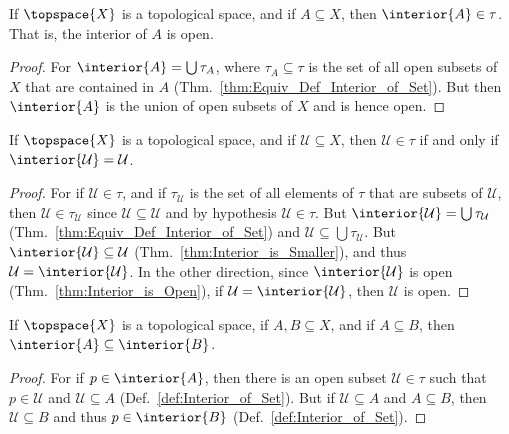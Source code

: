         \begin{theorem}
            \label{thm:Interior_is_Open}%
            If $\topspace{X}$ is a topological space, and if
            $A\subseteq{X}$, then $\interior{A}\in\tau$. That is, the
            interior of $A$ is open.
        \end{theorem}
        \begin{proof}
            For $\interior{A}=\bigcup\tau_{A}$, where
            $\tau_{A}\subseteq\tau$ is the set of all open subsets of $X$
            that are contained in $A$
            (Thm.~\ref{thm:Equiv_Def_Interior_of_Set}). But then
            $\interior{A}$ is the union of open subsets of $X$ and is hence
            open.
        \end{proof}
        \begin{theorem}
            \label{thm:Open_iff_Int_A_eq_A}%
            If $\topspace{X}$ is a topological space, and if
            $\mathcal{U}\subseteq{X}$, then $\mathcal{U}\in\tau$ if and only
            if $\interior{\mathcal{U}}=\mathcal{U}$.
        \end{theorem}
        \begin{proof}
            For if $\mathcal{U}\in\tau$, and if $\tau_{\mathcal{U}}$ is the
            set of all elements of $\tau$ that are subsets of $\mathcal{U}$,
            then $\mathcal{U}\in\tau_{\mathcal{U}}$ since
            $\mathcal{U}\subseteq\mathcal{U}$ and by hypothesis
            $\mathcal{U}\in\tau$. But
            $\interior{\mathcal{U}}=\bigcup\tau_{\mathcal{U}}$
            (Thm.~\ref{thm:Equiv_Def_Interior_of_Set}) and
            $\mathcal{U}\subseteq\bigcup\tau_{\mathcal{U}}$. But
            $\interior{\mathcal{U}}\subseteq\mathcal{U}$
            (Thm.~\ref{thm:Interior_is_Smaller}), and thus
            $\mathcal{U}=\interior{\mathcal{U}}$. In the other direction,
            since $\interior{\mathcal{U}}$ is open
            (Thm.~\ref{thm:Interior_is_Open}), if
            $\mathcal{U}=\interior{\mathcal{U}}$, then $\mathcal{U}$ is
            open.
        \end{proof}
        \begin{theorem}
            \label{thm:Interior_Preserves_Inclusion}%
            If $\topspace{X}$ is a topological space, if $A,B\subseteq{X}$,
            and if $A\subseteq{B}$, then
            $\interior{A}\subseteq\interior{B}$.
        \end{theorem}
        \begin{proof}
            For if $p\in\interior{A}$, then there is an open subset
            $\mathcal{U}\in\tau$ such that $p\in\mathcal{U}$ and
            $\mathcal{U}\subseteq{A}$ (Def.~\ref{def:Interior_of_Set}). But
            if $\mathcal{U}\subseteq{A}$ and $A\subseteq{B}$, then
            $\mathcal{U}\subseteq{B}$ and thus $p\in\interior{B}$
            (Def.~\ref{def:Interior_of_Set}).
        \end{proof}
